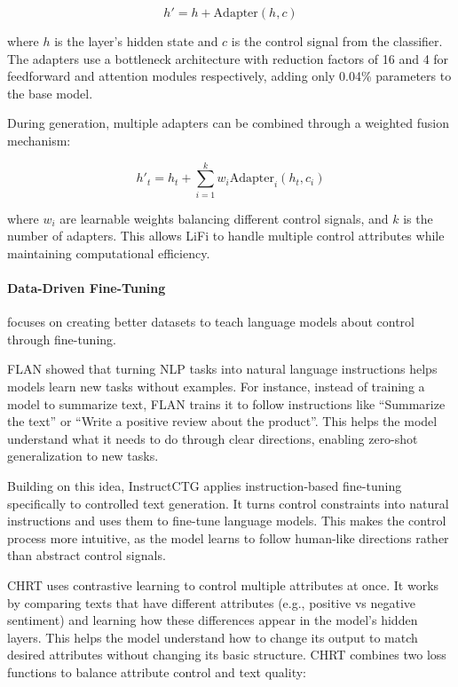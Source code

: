 \begin{equation}
    h' = h + \text{Adapter}(h, c)
\end{equation}

where $h$ is the layer's hidden state and $c$ is the control signal from the classifier. The adapters use a bottleneck architecture with reduction factors of 16 and 4 for feedforward and attention modules respectively, adding only 0.04\% parameters to the base model.

During generation, multiple adapters can be combined through a weighted fusion mechanism:

\begin{equation}
    h'_t = h_t + \sum_{i=1}^k w_i \text{Adapter}_i(h_t, c_i)
\end{equation}

where $w_i$ are learnable weights balancing different control signals, and $k$ is the number of adapters. This allows LiFi to handle multiple control attributes while maintaining computational efficiency.

\paragraph{Data-Driven Fine-Tuning} 
focuses on creating better datasets to teach language models about control through fine-tuning.

FLAN \cite{wei2022finetunedlanguagemodelszeroshot} showed that turning NLP tasks into natural language instructions helps models learn new tasks without examples. 
For instance, instead of training a model to summarize text, FLAN trains it to follow instructions like ``Summarize the text'' or ``Write a positive review about the product''.
This helps the model understand what it needs to do through clear directions, enabling zero-shot generalization to new tasks.

Building on this idea, InstructCTG \cite{zhou2023controlledtextgenerationnatural} applies instruction-based fine-tuning specifically to controlled text generation. 
It turns control constraints into natural instructions and uses them to fine-tune language models. This makes the control process more intuitive, as the model learns to follow human-like directions rather than abstract control signals.

CHRT \cite{kumar-etal-2023-controlled} uses contrastive learning to control multiple attributes at once. 
It works by comparing texts that have different attributes (e.g., positive vs negative sentiment) and learning how these differences appear in the model's hidden layers. 
This helps the model understand how to change its output to match desired attributes without changing its basic structure.
CHRT combines two loss functions to balance attribute control and text quality:

